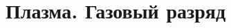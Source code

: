 \chapter{Плазма. Газовый разряд}



\newpage




\pagestyle{back}
\def\supplementtitle{Газовый разряд}

\pagestyle{main}